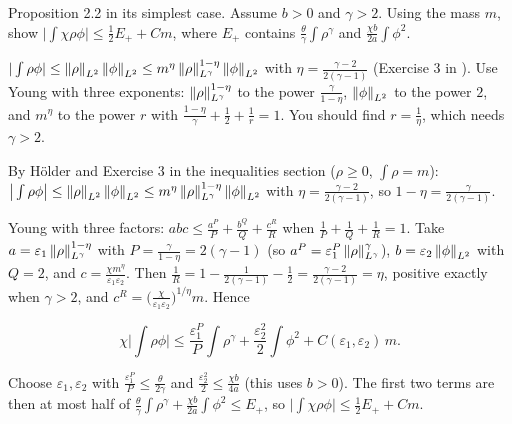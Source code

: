 \begin{exercise}
  Proposition 2.2 in its simplest case. Assume $b > 0$ and $\gamma > 2$. Using the mass $m$, show $\big|\int\chi\rho\phi\big| \le \frac12E_+ + Cm$, where $E_+$ contains $\frac\theta\gamma\int\rho^\gamma$ and $\frac{\chi b}{2a}\int\phi^2$.
  \begin{hint}
    $|\int\rho\phi| \le \left\lVert \rho\right\rVert_{L^2}\left\lVert \phi\right\rVert_{L^2} \le m^\eta\left\lVert \rho\right\rVert_{L^\gamma}^{1-\eta}\left\lVert \phi\right\rVert_{L^2}$ with $\eta = \frac{\gamma-2}{2(\gamma-1)}$ (Exercise 3 in ). Use Young with three exponents: $\left\lVert \rho\right\rVert_{L^\gamma}^{1-\eta}$ to the power $\frac{\gamma}{1-\eta}$, $\left\lVert \phi\right\rVert_{L^2}$ to the power $2$, and $m^\eta$ to the power $r$ with $\frac{1-\eta}{\gamma} + \frac12 + \frac1r = 1$. You should find $r = \frac1\eta$, which needs $\gamma > 2$.
  \end{hint}
  \begin{solution}
    By Hölder and Exercise 3 in the inequalities section ($\rho \ge 0$, $\int\rho = m$): $\big|\int\rho\phi\big| \le \left\lVert \rho\right\rVert_{L^2}\left\lVert \phi\right\rVert_{L^2} \le m^\eta\left\lVert \rho\right\rVert_{L^\gamma}^{1-\eta}\left\lVert \phi\right\rVert_{L^2}$ with $\eta = \frac{\gamma-2}{2(\gamma-1)}$, so $1 - \eta = \frac{\gamma}{2(\gamma-1)}$.

    Young with three factors: $abc \le \frac{a^P}{P} + \frac{b^Q}{Q} + \frac{c^R}{R}$ when $\frac1P + \frac1Q + \frac1R = 1$. Take $a = \varepsilon_1\left\lVert \rho\right\rVert_{L^\gamma}^{1-\eta}$ with $P = \frac{\gamma}{1-\eta} = 2(\gamma-1)$ (so $a^P = \varepsilon_1^P\left\lVert \rho\right\rVert_{L^\gamma}^\gamma$), $b = \varepsilon_2\left\lVert \phi\right\rVert_{L^2}$ with $Q = 2$, and $c = \frac{\chi m^\eta}{\varepsilon_1\varepsilon_2}$. Then $\frac1R = 1 - \frac{1}{2(\gamma-1)} - \frac12 = \frac{\gamma-2}{2(\gamma-1)} = \eta$, positive exactly when $\gamma > 2$, and $c^R = \big(\frac{\chi}{\varepsilon_1\varepsilon_2}\big)^{1/\eta}m$. Hence

    \[ \chi\Big|\int\rho\phi\Big| \le \frac{\varepsilon_1^P}{P}\int\rho^\gamma + \frac{\varepsilon_2^2}{2}\int\phi^2 + C(\varepsilon_1,\varepsilon_2)\,m. \]

    Choose $\varepsilon_1, \varepsilon_2$ with $\frac{\varepsilon_1^P}{P} \le \frac{\theta}{2\gamma}$ and $\frac{\varepsilon_2^2}{2} \le \frac{\chi b}{4a}$ (this uses $b > 0$). The first two terms are then at most half of $\frac\theta\gamma\int\rho^\gamma + \frac{\chi b}{2a}\int\phi^2 \le E_+$, so $\big|\int\chi\rho\phi\big| \le \frac12E_+ + Cm$.
  \end{solution}
\end{exercise}

